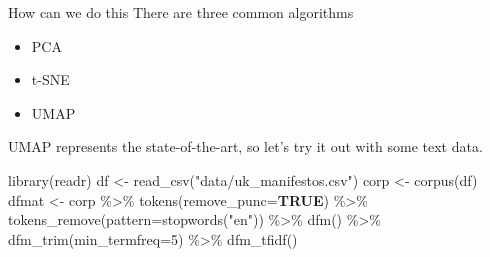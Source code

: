 \documentclass[
  10pt,
  ignorenonframetext,
  aspectratio=169]{beamer}
\newenvironment{Shaded}{\begin{snugshade}}{\end{snugshade}}
\newcommand{\AttributeTok}[1]{\textcolor[rgb]{0.80,0.80,0.80}{#1}}
\newcommand{\ConstantTok}[1]{\textcolor[rgb]{0.86,0.64,0.64}{\textbf{#1}}}
\newcommand{\DecValTok}[1]{\textcolor[rgb]{0.86,0.86,0.80}{#1}}
\newcommand{\FunctionTok}[1]{\textcolor[rgb]{0.94,0.94,0.56}{#1}}
\newcommand{\NormalTok}[1]{\textcolor[rgb]{0.80,0.80,0.80}{#1}}
\newcommand{\OtherTok}[1]{\textcolor[rgb]{0.94,0.94,0.56}{#1}}
\newcommand{\SpecialCharTok}[1]{\textcolor[rgb]{0.86,0.64,0.64}{#1}}
\newcommand{\StringTok}[1]{\textcolor[rgb]{0.80,0.58,0.58}{#1}}
\providecommand{\tightlist}{%
  \setlength{\itemsep}{0pt}\setlength{\parskip}{0pt}}
\begin{document}
\begin{frame}[fragile]{How can we do this}
\protect\hypertarget{how-can-we-do-this}{}
There are three common algorithms

\begin{itemize}
\tightlist
\item
  PCA
\item
  t-SNE
\item
  UMAP
\end{itemize}

UMAP represents the state-of-the-art, so let's try it out with some text
data.

\scriptsize

\begin{Shaded}
\begin{Highlighting}[]
\FunctionTok{library}\NormalTok{(readr)}
\NormalTok{df }\OtherTok{\textless{}{-}} \FunctionTok{read\_csv}\NormalTok{(}\StringTok{"data/uk\_manifestos.csv"}\NormalTok{)}
\NormalTok{corp }\OtherTok{\textless{}{-}} \FunctionTok{corpus}\NormalTok{(df)}
\NormalTok{dfmat }\OtherTok{\textless{}{-}}\NormalTok{ corp }\SpecialCharTok{\%\textgreater{}\%} \FunctionTok{tokens}\NormalTok{(}\AttributeTok{remove\_punc=}\ConstantTok{TRUE}\NormalTok{) }\SpecialCharTok{\%\textgreater{}\%}
  \FunctionTok{tokens\_remove}\NormalTok{(}\AttributeTok{pattern=}\FunctionTok{stopwords}\NormalTok{(}\StringTok{"en"}\NormalTok{)) }\SpecialCharTok{\%\textgreater{}\%}
  \FunctionTok{dfm}\NormalTok{() }\SpecialCharTok{\%\textgreater{}\%}
  \FunctionTok{dfm\_trim}\NormalTok{(}\AttributeTok{min\_termfreq=}\DecValTok{5}\NormalTok{) }\SpecialCharTok{\%\textgreater{}\%}
  \FunctionTok{dfm\_tfidf}\NormalTok{()}
\end{Highlighting}
\end{Shaded}
\end{frame}
\end{document}
